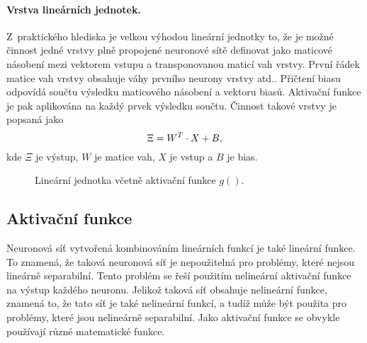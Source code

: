 \paragraph{Vrstva lineárních jednotek.}
Z~praktického hlediska je velkou výhodou lineární jednotky to, že je možné činnost jedné vrstvy plně propojené neuronové sítě definovat jako maticové násobení mezi vektorem vstupu a transponovanou maticí vah vrstvy.
První řádek matice vah vrstvy obsahuje váhy prvního neurony vrstvy atd..
Přičtení biasu odpovídá součtu výsledku maticového násobení a vektoru biasů.
Aktivační funkce je pak aplikována na každý prvek výsledku součtu.
Činnost takové vrstvy je popsaná jako \begin{equation}\sisetup{tight-spacing=true} \Xi=W^{T}\cdot X+B,\label{eq:linear_layer}\end{equation} kde $\Xi$ je výstup, $W$ je matice vah, $X$ je vstup a $B$ je bias.

\begin{figure}
\centering
{}
\caption{Lineární jednotka včetně aktivační funkce $g()$.}
\label{fig:linear_unit}
\end{figure}

\subsection{Aktivační funkce}
\label{sub:activ}

Neuronová síť vytvořená kombinováním lineárních funkcí je také lineární funkce.
To znamená, že taková neuronová síť je nepoužitelná pro problémy, které nejsou lineárně separabilní.
Tento problém se řeší použitím nelineární aktivační funkce na výstup každého neuronu.
Jelikož taková síť obsahuje nelineární funkce, znamená to, že tato síť je také nelineární funkcí, a tudíž může být použita pro problémy, které jsou nelineárně separabilní.
Jako aktivační funkce se obvykle používají různé matematické funkce.

